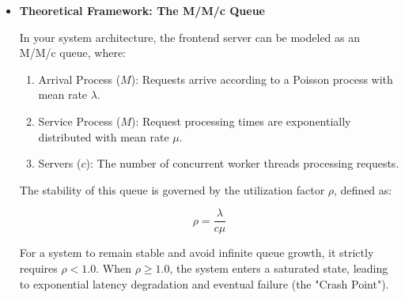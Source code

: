 \documentclass{article}
\begin{document}
\begin{itemize}
In traditional Connection Per-Request (CPR) architectures, $T_{net\_and\_queue\_ms}$ serves as the primary indicator of connection bottlenecks, as exhausted connection pools force requests into extended waiting states. Under normal circumstances, this results in a strong positive correlation between load ($\lambda$) and queueing delay ($W_q$).However, our empirical analysis of the implemented PCR (Connection/Compute-to-Queue) model demonstrates a disruption of this bottleneck paradigm. A Pearson correlation analysis revealed a surprisingly weak and statistically insignificant relationship between target rate and queue time ($r = 0.1410$, $p = 0.059$). This decoupled relationship indicates that the system does not succumb to exponential queueing under high concurrency.The mechanism behind this stability is the highly proactive autonomic controller. A point-biserial correlation confirmed a strong, highly significant relationship between the target load and the controller's triggered state ($r_{pb} = 0.8607$, $p < 0.0001$). Furthermore, logistic regression modeling established that the controller is acutely sensitive to early-stage network degradation; for every 1ms increase in queue time, the odds of an autonomic intervention increase by a factor of 1.89. Ultimately, these mathematical findings prove that the PCR model proactively restructures resources at the earliest signs of latency variation, successfully capping the connection bottleneck long before catastrophic CPR-style queuing can occur.

\item \textbf{Theoretical Framework: The M/M/c Queue}

In your system architecture, the frontend server can be modeled as an M/M/c queue, where:
\begin{enumerate}
    \item Arrival Process ($M$): Requests arrive according to a Poisson process with mean rate $\lambda$.
    \item Service Process ($M$): Request processing times are exponentially distributed with mean rate $\mu$.
    \item Servers ($c$): The number of concurrent worker threads processing requests.
\end{enumerate}

The stability of this queue is governed by the utilization factor $\rho$, defined as:

    $$\rho = \frac{\lambda}{c \mu}$$

For a system to remain stable and avoid infinite queue growth, it strictly requires $\rho < 1.0$. When $\rho \ge 1.0$, the system enters a saturated state, leading to exponential latency degradation and eventual failure (the "Crash Point").


\end{itemize}
\end{document}
